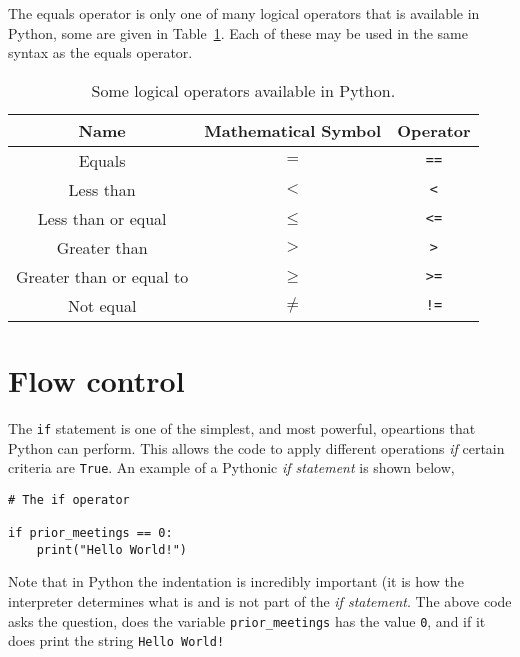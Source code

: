 \documentclass[a4paper]{article}
\begin{document}
The equals operator is only one of many logical operators that is available in Python, some are given in Table~\ref{tab:ops}.
Each of these may be used in the same syntax as the equals operator.
\begin{table}[h]
	\centering
	\caption{Some logical operators available in Python.}
	\label{tab:ops}
	\begin{tabular}{c c c}
		\hline
		Name & Mathematical Symbol & Operator \\
		\hline
		Equals & $=$ &\texttt{==} \\
		Less than & $<$ & \texttt{<} \\
		Less than or equal & $\leq$ & \texttt{<=} \\
		Greater than & $>$ & \texttt{>} \\
		Greater than or equal to & $\geq$ & \texttt{>=} \\
		Not equal & $\neq$ & \texttt{!=}  \\
		\hline
	\end{tabular}
\end{table}
\vspace{\baselineskip}
\begin{center}
	\noindent{}
\end{center}

\section{Flow control}

The \texttt{if} statement is one of the simplest, and most powerful, opeartions that Python can perform.
This allows the code to apply different operations \emph{if} certain criteria are \texttt{True}.
An example of a Pythonic \emph{if statement} is shown below,
\begin{lstlisting}
# The if operator

if prior_meetings == 0:
    print("Hello World!")
\end{lstlisting}
Note that in Python the indentation is incredibly important (it is how the interpreter determines what is and is not part of the \emph{if statement}.
The above code asks the question, does the variable \texttt{prior\_meetings} has the value \texttt{0}, and if it does print the string \texttt{Hello World!}
\end{document}
